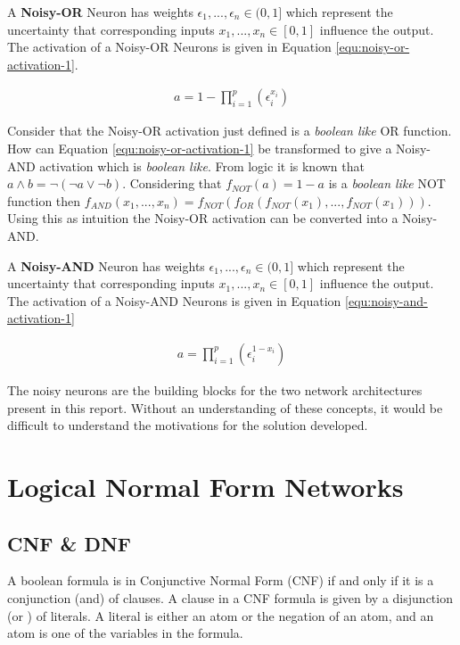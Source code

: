 \begin{definition}
	A \textbf{Noisy-OR} Neuron has weights $\epsilon_1, ..., \epsilon_n \in (0,1]$ which represent the uncertainty that corresponding inputs $x_1, ..., x_n \in [0,1]$ influence the output. The activation of a Noisy-OR Neurons is given in Equation \ref{equ:noisy-or-activation-1}.
	
	\begin{align}
	a = 1 - \prod^p_{i=1} (\epsilon_i^{x_i})
	\label{equ:noisy-or-activation-1}
	\end{align}
\end{definition}

Consider that the Noisy-OR activation just defined is a \textit{boolean like} OR function. How can Equation \ref{equ:noisy-or-activation-1} be transformed to give a Noisy-AND activation which is \textit{boolean like}. From logic it is known that $a \land b = \lnot (\lnot a \lor \lnot b)$. Considering that $f_{NOT}(a) = 1 - a$ is a \textit{boolean like} NOT function then $f_{AND}(x_1, ..., x_n) = f_{NOT}(f_{OR}(f_{NOT}(x_1), ..., f_{NOT}(x_1)))$. Using this as intuition the Noisy-OR activation can be converted into a Noisy-AND.

\begin{definition}
	A \textbf{Noisy-AND} Neuron has weights $\epsilon_1, ..., \epsilon_n \in (0, 1]$ which represent the uncertainty that corresponding inputs $x_1, ..., x_n \in [0,1]$ influence the output. The activation of a Noisy-AND Neurons is given in Equation \ref{equ:noisy-and-activation-1}
	
	\begin{align}
	a = \prod^p_{i=1} (\epsilon_i^{1 - x_i})
	\label{equ:noisy-and-activation-1}
	\end{align}
\end{definition}

The noisy neurons are the building blocks for the two network architectures present in this report. Without an understanding of these concepts, it would be difficult to understand the motivations for the solution developed.

\section{Logical Normal Form Networks}
\subsection{CNF \& DNF}
A boolean formula is in Conjunctive Normal Form (CNF) if and only if it is a conjunction (and) of clauses. A clause in a CNF formula is given by a disjunction (or ) of literals. A literal is either an atom or the negation of an atom, and an atom is one of the variables in the formula.\\

